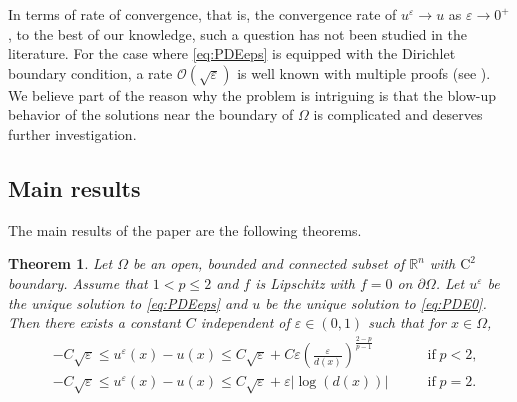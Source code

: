 \documentclass[12pt,reqno]{amsart}
\numberwithin{figure}{section}
\theoremstyle{plain}
\newtheorem{thm}{Theorem}[section]
\theoremstyle{remark}
\numberwithin{equation}{section}
\newcommand{\R}{\mathbb{R}}
\begin{document}
In terms of rate of convergence, that is, the convergence rate of $u^\varepsilon\to u$ as $\varepsilon\to 0^+$, to the best of our knowledge, such a question has not been studied in the literature. For the case where \eqref{eq:PDEeps} is equipped with the Dirichlet boundary condition, a rate $\mathcal{O}(\sqrt{\varepsilon})$ is well known with multiple proofs (see \cite{Bardi1997,crandall1984, tran_hamilton-jacobi_2021}). We believe part of the reason why the problem is intriguing is that the blow-up behavior of the solutions near the boundary of $\Omega$ is complicated and deserves further investigation.

\subsection{Main results} The main results of the paper are the following theorems.


\begin{thm}\label{main_thm1} Let $\Omega$ be an open, bounded and connected subset of $\R^n$ with $\mathrm{C}^2$ boundary. Assume that $1 < p\leq 2$ and $f$ is Lipschitz with $f = 0$ on $\partial\Omega$. Let $u^\varepsilon$ be the unique solution to \eqref{eq:PDEeps} and $u$ be the unique solution to \eqref{eq:PDE0}. Then there exists a constant $C$ independent of $\varepsilon\in (0,1)$ such that for $x\in \Omega$,
\begin{align*}
    &-C\sqrt{\varepsilon}\leq  u^\varepsilon(x) - u(x)\leq C\sqrt{\varepsilon} + C\varepsilon \left(\frac{\varepsilon}{d(x)}\right)^{\frac{2-p}{p-1}} &\qquad\text{if}\; p < 2,\\
    &-C\sqrt{\varepsilon}\leq  u^\varepsilon(x) - u(x)\leq C\sqrt{\varepsilon} + \varepsilon|\log(d(x))| &\qquad\text{if}\; p = 2.
\end{align*}
\end{thm}
\end{document}
